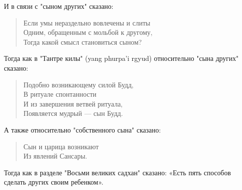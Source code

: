\begin{siderules}
И в связи с "сыном других" сказано:
\begin{verse}
Если умы нераздельно вовлечены и слиты\\
Одним, обращенным с мольбой к другому,\\
Тогда какой смысл становиться сыном?\\
\end{verse}

Тогда как в "Тантре килы" (yang phurpa'i rgyud) относительно "сына других" сказано:
\begin{verse}
Подобно возникающему силой Будд,\\
В ритуале спонтанности\\
И из завершения ветвей ритуала,\\
Появляется мудрый — сын Будд.\\
\end{verse}
А также относительно "собственного сына" сказано:
\begin{verse}
Сын и царица возникают\\
Из явлений Сансары.\\
\end{verse}
Тогда как в разделе "Восьми великих садхан" сказано:
«Есть пять способов сделать других своим ребенком».\\


\end{siderules}

